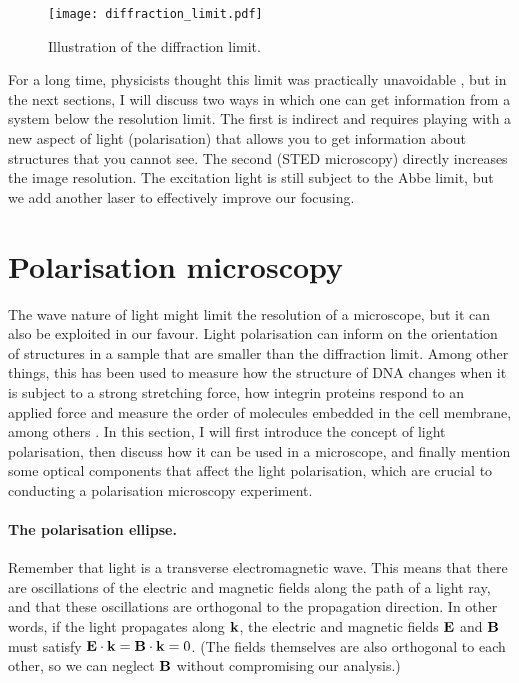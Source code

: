 \begin{figure}
	\centering
	\texttt{[image: diffraction\_limit.pdf]}
	\caption{Illustration of the diffraction limit.}
	\label{fig:diffraction limit}
\end{figure}

For a long time, physicists thought this limit was practically unavoidable \cite{McCutchen1967}, but in the next sections, I will discuss two ways in which one can get information from a system below the resolution limit. The first is indirect and requires playing with a new aspect of light (polarisation) that allows you to get information about structures that you cannot see. The second (STED microscopy) directly increases the image resolution. The excitation light is still subject to the Abbe limit, but we add another laser to effectively improve our focusing.

\section{Polarisation microscopy}

The wave nature of light might limit the resolution of a microscope, but it can also be exploited in our favour. Light polarisation can inform on the orientation of structures in a sample that are smaller than the diffraction limit. Among other things, this has been used to measure how the structure of DNA changes when it is subject to a strong stretching force, how integrin proteins respond to an applied force and measure the order of molecules embedded in the cell membrane, among others \cite{Backer2019, Nordenfelt2017, Swaminathan2017, Brasselet2013}. In this section, I will first introduce the concept of light polarisation, then discuss how it can be used in a microscope, and finally mention some optical components that affect the light polarisation, which are crucial to conducting a polarisation microscopy experiment.

\paragraph{The polarisation ellipse.} Remember that light is a transverse electromagnetic wave. This means that there are oscillations of the electric and magnetic fields along the path of a light ray, and that these oscillations are orthogonal to the propagation direction. In other words, if the light propagates along $\vb{k}$, the electric and magnetic fields $\vb{E}$ and $\vb{B}$ must satisfy $ \vb{E} \cdot \vb{k} = \vb{B} \cdot \vb{k} = 0$. (The fields themselves are also orthogonal to each other, so we can neglect $ \vb{B} $ without compromising our analysis.)

